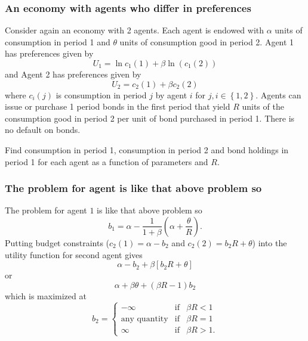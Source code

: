 \documentclass[aspectratio=169]{ltx-talk}
\begin{document}
\begin{frame}
\frametitle{An economy with agents who differ in preferences}
Consider again an economy with 2 agents. Each agent is endowed with $\alpha $
units of consumption in period 1 and $\theta $ units of consumption good in
period 2. Agent 1 has preferences given by 
\begin{equation*}
U_{1}=\ln c_{1}\left( 1\right) +\beta \ln \left( c_{1}\left( 2\right) \right)
\end{equation*}%
and Agent 2 has preferences given by 
\begin{equation*}
U_{2}=c_{2}\left( 1\right) +\beta c_{2}\left( 2\right)
\end{equation*}%
where $c_{i}\left( j\right) $ is consumption in period $j$ by agent $i$ for $%
j,i\in \left\{ 1,2\right\} .$ Agents can issue or purchase 1 period bonds in
the first period that yield $R$ units of the consumption good in period 2
per unit of bond purchased in period 1. There is no default on bonds.

Find consumption in period 1, consumption in period 2 and bond holdings in
period 1 for each agent as a function of parameters and $R.$\newline
\end{frame}

\begin{frame}
\frametitle{The problem for agent is like that above problem so}
The problem for agent $1$ is like that above problem so 
\begin{equation}
b_{1}=\alpha -\frac{1}{1+\beta }\left( \alpha +\frac{\theta }{R}\right) .
\label{bond1}
\end{equation}%
Putting budget constraints ($c_{2}\left( 1\right) =\alpha -b_{2}$ and $%
c_{2}\left( 2\right) =b_{2}R+\theta $) into the utility function for second
agent gives 
\begin{equation*}
\alpha -b_{2}+\beta \left[ b_{2}R+\theta \right]
\end{equation*}%
or 
\begin{equation*}
\alpha +\beta \theta +\left( \beta R-1\right) b_{2}
\end{equation*}%
which is maximized at%
\begin{equation*}
b_{2}=\left\{ 
\begin{array}{ccc}
-\infty & \text{if} & \beta R<1 \\ 
\text{any quantity} & \text{if} & \beta R=1 \\ 
\infty & \text{if} & \beta R>1.%
\end{array}%
\right.
\end{equation*}
\end{frame}
\end{document}
